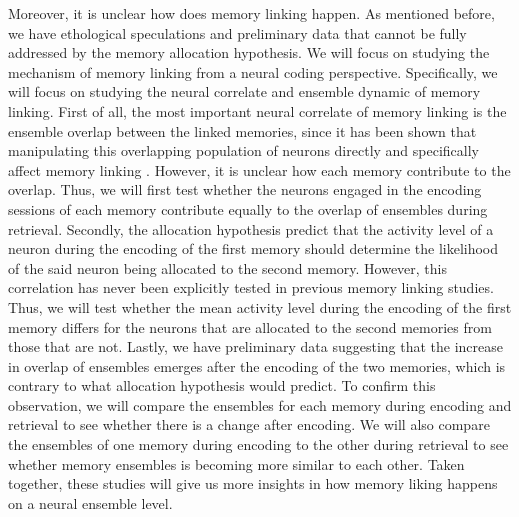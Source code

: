 \documentclass[master.tex]{subfiles}
\begin{document}
Moreover, it is unclear how does memory linking happen. As mentioned before, we
have ethological speculations and preliminary data that cannot be fully
addressed by the memory allocation hypothesis. We will focus on studying the
mechanism of memory linking from a neural coding perspective. Specifically, we
will focus on studying the neural correlate and ensemble dynamic of memory
linking. First of all, the most important neural correlate of memory linking is
the ensemble overlap between the linked memories, since it has been shown that
manipulating this overlapping population of neurons directly and specifically
affect memory linking \cite{yokose_overlapping_2017}. However, it is unclear how
each memory contribute to the overlap. Thus, we will first test whether the
neurons engaged in the encoding sessions of each memory contribute equally to
the overlap of ensembles during retrieval. Secondly, the allocation hypothesis
predict that the activity level of a neuron during the encoding of the first
memory should determine the likelihood of the said neuron being allocated to the
second memory. However, this correlation has never been explicitly tested in
previous memory linking studies. Thus, we will test whether the mean activity
level during the encoding of the first memory differs for the neurons that are
allocated to the second memories from those that are not. Lastly, we have
preliminary data suggesting that the increase in overlap of ensembles emerges
after the encoding of the two memories, which is contrary to what allocation
hypothesis would predict. To confirm this observation, we will compare the
ensembles for each memory during encoding and retrieval to see whether there is
a change after encoding. We will also compare the ensembles of one memory during
encoding to the other during retrieval to see whether memory ensembles is
becoming more similar to each other. Taken together, these studies will give us
more insights in how memory liking happens on a neural ensemble level.
\end{document}
